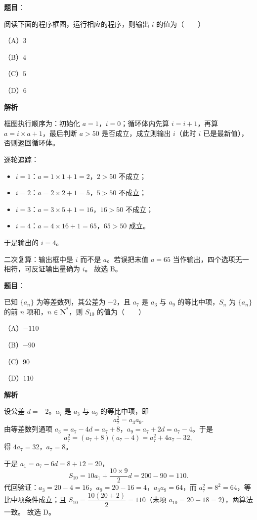 \begin{answer}

\textbf{题目}：

阅读下面的程序框图，运行相应的程序，则输出 $i$ 的值为\mbox{（　　）}

（A）$3$

（B）$4$

（C）$5$

（D）$6$
\nopagebreak[4]
\begin{center}\end{center}
\nopagebreak[4]
\textbf{解析}

框图执行顺序为：初始化 $a=1$，$i=0$；循环体内先算 $i=i+1$，再算 $a=i\times a+1$，最后判断 $a>50$ 是否成立，成立则输出 $i$（此时 $i$ 已是最新值），否则返回循环体。

逐轮追踪：

\begin{itemize}
\item $i=1$：$a=1\times1+1=2$，$2>50$ 不成立；
\item $i=2$：$a=2\times2+1=5$，$5>50$ 不成立；
\item $i=3$：$a=3\times5+1=16$，$16>50$ 不成立；
\item $i=4$：$a=4\times16+1=65$，$65>50$ 成立。
\end{itemize}

于是输出的 $i=4$。

二次复算：输出框中是 $i$ 而不是 $a$。若误把末值 $a=65$ 当作输出，四个选项无一相符，可反证输出量确为 $i$。
故选 B。


\end{answer}
\begin{answer}

\textbf{题目}：

已知 $\{a_n\}$ 为等差数列，其公差为 $-2$，且 $a_7$ 是 $a_3$ 与 $a_9$ 的等比中项，$S_n$ 为 $\{a_n\}$ 的前 $n$ 项和，$n\in\mathbf{N}^*$，则 $S_{10}$ 的值为\mbox{（　　）}

（A）$-110$

（B）$-90$

（C）$90$

（D）$110$

\textbf{解析}

设公差 $d=-2$。$a_7$ 是 $a_3$ 与 $a_9$ 的等比中项，即
\nopagebreak[4]
\[a_7^2=a_3a_9.\]
由等差数列通项 $a_3=a_7-4d=a_7+8$，$a_9=a_7+2d=a_7-4$。于是
\nopagebreak[4]
\[a_7^2=(a_7+8)(a_7-4)=a_7^2+4a_7-32,\]
得 $4a_7=32$，$a_7=8$。

于是 $a_1=a_7-6d=8+12=20$，
\nopagebreak[4]
\[S_{10}=10a_1+\frac{10\times9}{2}d=200-90=110.\]
代回验证：$a_3=20-4=16$，$a_9=20-16=4$，$a_3a_9=64$，而 $a_7^2=8^2=64$，等比中项条件成立；且 $S_{10}=\dfrac{10(20+2)}{2}=110$（末项 $a_{10}=20-18=2$），两算法一致。
故选 D。


\end{answer}
